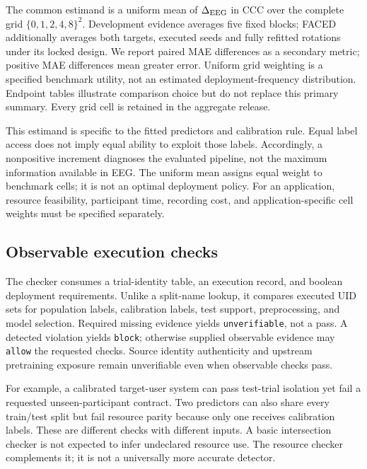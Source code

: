 \documentclass{article}
\begin{document}
The common estimand is a uniform mean of $\Delta_{\rm EEG}$ in CCC over
the complete grid $\{0,1,2,4,8\}^2$. Development evidence averages five
fixed blocks; FACED additionally averages both targets, executed seeds and
fully refitted rotations under its locked design.
We report paired MAE differences as a secondary metric; positive MAE differences
mean greater error. Uniform grid weighting is a specified benchmark utility,
not an estimated deployment-frequency distribution. Endpoint tables illustrate
comparison choice but do not replace this primary summary. Every grid cell is
retained in the aggregate release.

This estimand is specific to the fitted predictors and calibration rule.
Equal label access does not imply equal ability to exploit those labels.
Accordingly, a nonpositive increment diagnoses the evaluated pipeline, not
the maximum information available in EEG. The uniform mean assigns equal
weight to benchmark cells; it is not an optimal deployment policy. For an
application, resource feasibility, participant time, recording cost, and
application-specific cell weights must be specified separately.

\subsection{Observable execution checks}
The checker consumes a trial-identity table, an execution record, and boolean
deployment requirements. Unlike a split-name lookup, it compares executed UID
sets for population labels, calibration labels, test support, preprocessing,
and model selection. Required missing evidence yields \texttt{unverifiable},
not a pass. A detected violation yields \texttt{block}; otherwise supplied
observable evidence may \texttt{allow} the requested checks. Source identity
authenticity and upstream pretraining exposure remain unverifiable even when
observable checks pass.

For example, a calibrated target-user system can pass test-trial isolation yet
fail a requested unseen-participant contract. Two predictors can also share
every train/test split but fail resource parity because only one receives
calibration labels. These are different checks with different inputs. A basic
intersection checker is not expected to infer undeclared resource use. The
resource checker complements it; it is not a universally more accurate detector.
\end{document}
